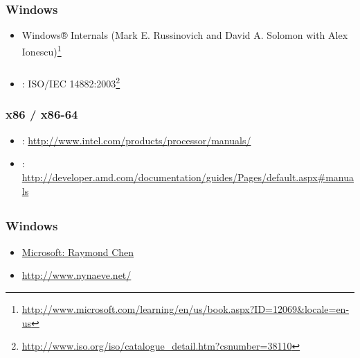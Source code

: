 ﻿\chapter{}

\section{}

\subsection{Windows}

\begin{itemize}
\item
Windows® Internals (Mark E. Russinovich and David A. Solomon with Alex Ionescu)\footnote{\url{http://www.microsoft.com/learning/en/us/book.aspx?ID=12069&locale=en-us}}
\end{itemize}

\subsection{\CCpp}

\begin{itemize}
\item
{}: ISO/IEC 14882:2003\footnote{\url{http://www.iso.org/iso/catalogue_detail.htm?csnumber=38110}}
\end{itemize}

\subsection{x86 / x86-64}

\begin{itemize}
\item
{}: \url{http://www.intel.com/products/processor/manuals/}
\item
{}: \url{http://developer.amd.com/documentation/guides/Pages/default.aspx#manuals}
\end{itemize}

\section{}

\subsection{Windows}

\begin{itemize}
\item
\href{http://blogs.msdn.com/oldnewthing/}{Microsoft: Raymond Chen}
\item
\url{http://www.nynaeve.net/}
\end{itemize}

